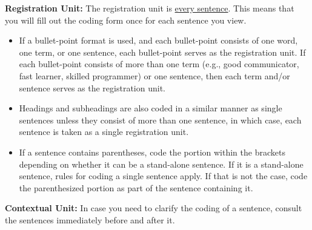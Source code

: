 \documentclass[jou]{apa7}
\begin{document}
\noindent\textbf{Registration Unit:} The registration unit is \uline{every sentence}. This means that you will fill out the coding form once for each sentence you view.
\begin{itemize}
    \item If a bullet-point format is used, and each bullet-point consists of one word, one term, or one sentence, each bullet-point serves as the registration unit. If each bullet-point consists of more than one term (e.g., good communicator, fast learner, skilled programmer) or one sentence, then each term and/or sentence serves as the registration unit.
    \item Headings and subheadings are also coded in a similar manner as single sentences unless they consist of more than one sentence, in which case, each sentence is taken as a single registration unit.
    \item If a sentence contains parentheses, code the portion within the brackets depending on whether it can be a stand-alone sentence. If it is a stand-alone sentence, rules for coding a single sentence apply. If that is not the case, code the parenthesized portion as part of the sentence containing it.
    \end{itemize}

\noindent\textbf{Contextual Unit:} In case you need to clarify the coding of a sentence, consult the sentences immediately before and after it.
\end{document}
